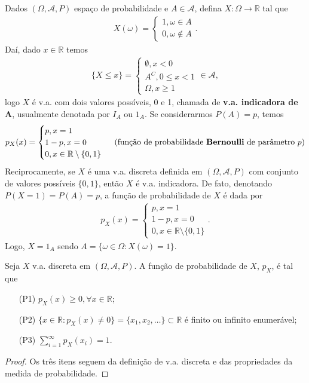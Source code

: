 \documentclass[../Notas.tex]{subfiles}
\begin{document}
\begin{example}
Dados $(\Omega, \mathcal{A}, P)$ espaço de probabilidade e $A\in\mathcal{A}$, defina $X:\Omega\to\mathbb{R}$ tal que
\begin{align*}
    X(\omega) = \begin{cases}
    1, \omega\in A \\
    0, \omega\notin A
    \end{cases}.
\end{align*}
Daí, dado $x\in\mathbb{R}$ temos
\begin{align*}
    \{X\leq x\} = \begin{cases}
    \emptyset, x < 0 \\
    A^C, 0\leq x < 1 \\
    \Omega, x\geq 1
    \end{cases}\in\mathcal{A},
\end{align*}
logo $X$ é v.a. com dois valores possíveis, 0 e 1, chamada de \textbf{v.a. indicadora de A}, usualmente denotada por $I_A$ ou $1_A$. Se considerarmos $P(A) = p$, temos
\begin{align*}
    p_X(x) = \begin{cases}
    p, x = 1 \\
    1 - p, x = 0 \\
    0, x\in\mathbb{R}\setminus\{0,1\}
    \end{cases} \text{ (função de probabilidade \textbf{Bernoulli} de parâmetro } p)
\end{align*}
Reciprocamente, se $X$ é uma v.a. discreta definida em $(\Omega, \mathcal{A}, P)$ com conjunto de valores possíveis $\{0,1\}$, então $X$ é v.a. indicadora. De fato, denotando $P(X=1) = P(A) = p$, a função de probabilidade de $X$ é dada por
\begin{align*}
    p_X(x) = \begin{cases}
    p, x = 1 \\
    1 - p, x = 0 \\
    0, x\in\mathbb{R}\setminus\{0,1\}
    \end{cases}.
\end{align*}
Logo, $X = 1_A$ sendo $A = \{ \omega\in\Omega : X(\omega) = 1 \}$.
\end{example}

\begin{proposition}
Seja $X$ v.a. discreta em $(\Omega, \mathcal{A}, P)$. A função de probabilidade de $X$, $p_X$, é tal que
\begin{itemize}
    \item[(P1)] $p_X(x) \geq 0, \forall x\in\mathbb{R}$;
    \item[(P2)] $\{ x\in\mathbb{R} : p_X(x) \neq 0 \} = \{ x_1, x_2, \dots \}\subset\mathbb{R}$ é finito ou infinito enumerável;
    \item[(P3)] $\displaystyle{ \sum_{i=1}^{\infty}p_X(x_i) = 1. }$
\end{itemize}
\end{proposition}
\begin{proof}
Os três itens seguem da definição de v.a. discreta e das propriedades da medida de probabilidade.
\end{proof}
\end{document}
